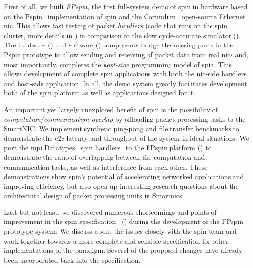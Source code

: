 First of all, we built \emph{FP\acs{spin}}, the first full-system demo of \ac{spin} in hardware based on the P\acs{spin}~\cite{di_girolamo_pspin_2021} implementation of \ac{spin} and the Corundum~\cite{forencich_corundum_2020} open-source Ethernet \ac{nic}.  This allows fast testing of packet \emph{handlers} (code that runs on the \ac{spin} cluster, more details in ) in comparison to the slow cycle-accurate simulator ().  The hardware () and software () components bridge the missing parts in the P\acs{spin} prototype to allow sending and receiving of packet data from real \ac{nic}s and, most importantly, completes the \emph{host-side} programming model of \ac{spin}.  This allows development of complete \ac{spin} applications with both the \ac{nic}-side handlers and host-side application.  In all, the demo system greatly facilitates development both of the \ac{spin} platform as well as applications designed for it.

An important yet largely unexplored benefit of \ac{spin} is the possibility of \emph{computation/communication overlap} by offloading packet processing tasks to the SmartNIC.  We implement synthetic ping-pong and file transfer benchmarks to demonstrate the \ac{e2e} latency and throughput of the system in ideal situations.  We port the \acs{mpi} Datatypes~\cite{ropo_processing_2009} \ac{spin} handlers~\cite{di_girolamo_network-accelerated_2019} to the FP\acs{spin} platform () to demonstrate the ratio of overlapping between the computation and communication tasks, as well as interference from each other.  These demonstrations show \ac{spin}'s potential of accelerating networked applications and improving efficiency, but also open up interesting research questions about the architectural design of packet processing units in Smart\acs{nic}s.

Last but not least, we discovered numerous shortcomings and points of improvement in the \ac{spin} specification~\cite{hoefler_spin_2017} () during the development of the FP\acs{spin} prototype system.  We discuss about the issues closely with the \ac{spin} team and work together towards a more complete and sensible specification for other implementations of the paradigm.  Several of the proposed changes have already been incorporated back into the specification.